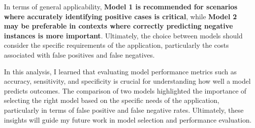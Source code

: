 \documentclass[
]{article}
\begin{document}
In terms of general applicability, \textbf{Model 1 is recommended for
scenarios where accurately identifying positive cases is critical},
while \textbf{Model 2 may be preferable in contexts where correctly
predicting negative instances is more important}. Ultimately, the choice
between models should consider the specific requirements of the
application, particularly the costs associated with false positives and
false negatives.

In this analysis, I learned that evaluating model performance metrics
such as accuracy, sensitivity, and specificity is crucial for
understanding how well a model predicts outcomes. The comparison of two
models highlighted the importance of selecting the right model based on
the specific needs of the application, particularly in terms of false
positive and false negative rates. Ultimately, these insights will guide
my future work in model selection and performance evaluation.
\end{document}
